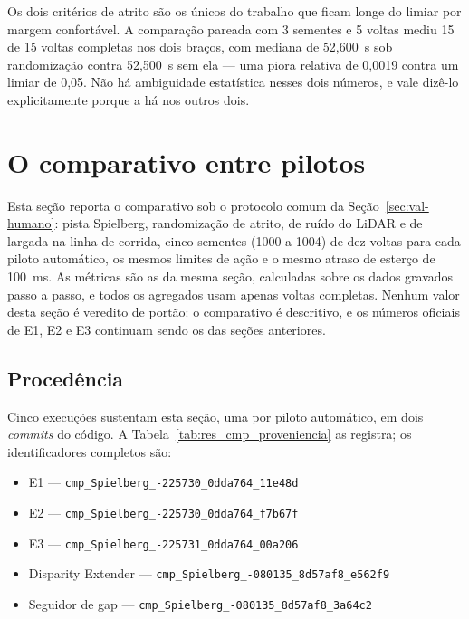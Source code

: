 Os dois critérios de atrito são os únicos do trabalho que ficam longe do limiar
por margem confortável. A comparação pareada com 3 sementes e 5 voltas mediu 15
de 15 voltas completas nos dois braços, com mediana de 52,600~s sob randomização
contra 52,500~s sem ela --- uma piora relativa de 0,0019 contra um limiar de
0,05. Não há ambiguidade estatística nesses dois números, e vale dizê-lo
explicitamente porque a há nos outros dois.

\section{O comparativo entre pilotos}\label{sec:res-comparativo}

Esta seção reporta o comparativo sob o protocolo comum da
Seção~\ref{sec:val-humano}: pista Spielberg, randomização de atrito, de ruído do
LiDAR e de largada na linha de corrida, cinco sementes (1000 a 1004) de dez
voltas para cada piloto automático, os mesmos limites de ação e o mesmo atraso
de esterço de 100~ms. As métricas são as da mesma seção, calculadas sobre os
dados gravados passo a passo, e todos os agregados usam apenas voltas completas.
Nenhum valor desta seção é veredito de portão: o comparativo é descritivo, e os
números oficiais de E1, E2 e E3 continuam sendo os das seções anteriores.

\subsection{Procedência}\label{sec:res-cmp-proveniencia}

Cinco execuções sustentam esta seção, uma por piloto automático, em dois
\textit{commits} do código. A Tabela~\ref{tab:res_cmp_proveniencia} as registra;
os identificadores completos são:

\begin{itemize}
    \item E1 --- \texttt{cmp\_\allowbreak Spielberg\_-225730\_\allowbreak 0dda764\_\allowbreak 11e48d}
    \item E2 --- \texttt{cmp\_\allowbreak Spielberg\_-225730\_\allowbreak 0dda764\_\allowbreak f7b67f}
    \item E3 --- \texttt{cmp\_\allowbreak Spielberg\_-225731\_\allowbreak 0dda764\_\allowbreak 00a206}
    \item Disparity Extender --- \texttt{cmp\_\allowbreak Spielberg\_-080135\_\allowbreak 8d57af8\_\allowbreak e562f9}
    \item Seguidor de gap --- \texttt{cmp\_\allowbreak Spielberg\_-080135\_\allowbreak 8d57af8\_\allowbreak 3a64c2}
\end{itemize}

